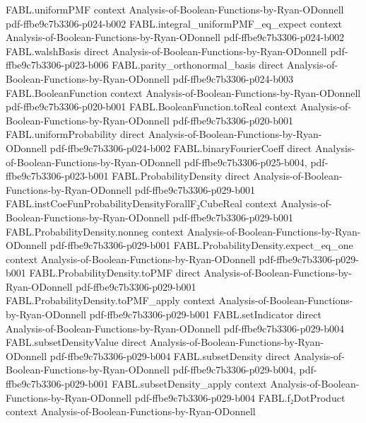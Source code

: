 \begin{theorem}
\proofstep
  {FABL.uniformPMF}
  {context}
  {Analysis-of-Boolean-Functions-by-Ryan-ODonnell}
  {pdf-ffbe9c7b3306-p024-b002}
\proofstep
  {FABL.integral_uniformPMF_eq_expect}
  {context}
  {Analysis-of-Boolean-Functions-by-Ryan-ODonnell}
  {pdf-ffbe9c7b3306-p024-b002}
\proofstep
  {FABL.walshBasis}
  {direct}
  {Analysis-of-Boolean-Functions-by-Ryan-ODonnell}
  {pdf-ffbe9c7b3306-p023-b006}
\proofstep
  {FABL.parity_orthonormal_basis}
  {direct}
  {Analysis-of-Boolean-Functions-by-Ryan-ODonnell}
  {pdf-ffbe9c7b3306-p024-b003}
\proofstep
  {FABL.BooleanFunction}
  {context}
  {Analysis-of-Boolean-Functions-by-Ryan-ODonnell}
  {pdf-ffbe9c7b3306-p020-b001}
\proofstep
  {FABL.BooleanFunction.toReal}
  {context}
  {Analysis-of-Boolean-Functions-by-Ryan-ODonnell}
  {pdf-ffbe9c7b3306-p020-b001}
\proofstep
  {FABL.uniformProbability}
  {direct}
  {Analysis-of-Boolean-Functions-by-Ryan-ODonnell}
  {pdf-ffbe9c7b3306-p024-b002}
\proofstep
  {FABL.binaryFourierCoeff}
  {direct}
  {Analysis-of-Boolean-Functions-by-Ryan-ODonnell}
  {pdf-ffbe9c7b3306-p025-b004,
    pdf-ffbe9c7b3306-p023-b001}
\proofstep
  {FABL.ProbabilityDensity}
  {direct}
  {Analysis-of-Boolean-Functions-by-Ryan-ODonnell}
  {pdf-ffbe9c7b3306-p029-b001}
\proofstep
  {FABL.instCoeFunProbabilityDensityForallF₂CubeReal}
  {context}
  {Analysis-of-Boolean-Functions-by-Ryan-ODonnell}
  {pdf-ffbe9c7b3306-p029-b001}
\proofstep
  {FABL.ProbabilityDensity.nonneg}
  {context}
  {Analysis-of-Boolean-Functions-by-Ryan-ODonnell}
  {pdf-ffbe9c7b3306-p029-b001}
\proofstep
  {FABL.ProbabilityDensity.expect_eq_one}
  {context}
  {Analysis-of-Boolean-Functions-by-Ryan-ODonnell}
  {pdf-ffbe9c7b3306-p029-b001}
\proofstep
  {FABL.ProbabilityDensity.toPMF}
  {direct}
  {Analysis-of-Boolean-Functions-by-Ryan-ODonnell}
  {pdf-ffbe9c7b3306-p029-b001}
\proofstep
  {FABL.ProbabilityDensity.toPMF_apply}
  {context}
  {Analysis-of-Boolean-Functions-by-Ryan-ODonnell}
  {pdf-ffbe9c7b3306-p029-b001}
\proofstep
  {FABL.setIndicator}
  {direct}
  {Analysis-of-Boolean-Functions-by-Ryan-ODonnell}
  {pdf-ffbe9c7b3306-p029-b004}
\proofstep
  {FABL.subsetDensityValue}
  {direct}
  {Analysis-of-Boolean-Functions-by-Ryan-ODonnell}
  {pdf-ffbe9c7b3306-p029-b004}
\proofstep
  {FABL.subsetDensity}
  {direct}
  {Analysis-of-Boolean-Functions-by-Ryan-ODonnell}
  {pdf-ffbe9c7b3306-p029-b004,
    pdf-ffbe9c7b3306-p029-b001}
\proofstep
  {FABL.subsetDensity_apply}
  {context}
  {Analysis-of-Boolean-Functions-by-Ryan-ODonnell}
  {pdf-ffbe9c7b3306-p029-b004}
\proofstep
  {FABL.f₂DotProduct}
  {context}
  {Analysis-of-Boolean-Functions-by-Ryan-ODonnell}

\end{theorem}
